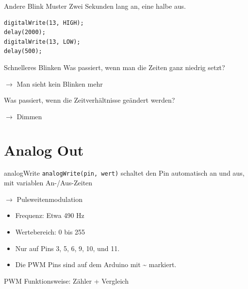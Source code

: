\documentclass[bigger]{beamer}
\begin{document}
\begin{frame}[fragile,label={sec:org77fbbf9}]{Andere Blink Muster}
 Zwei Sekunden lang an, eine halbe aus.

\pause

\begin{verbatim}
digitalWrite(13, HIGH);
delay(2000);
digitalWrite(13, LOW);
delay(500);
\end{verbatim}
\end{frame}

\begin{frame}[label={sec:orgf85b185}]{Schnelleres Blinken}
Was passiert, wenn man die Zeiten ganz niedrig setzt?
\pause

\(\rightarrow\) Man sieht kein Blinken mehr
\pause

Was passiert, wenn die Zeitverhältnisse geändert werden?
\pause

\(\rightarrow\) Dimmen
\end{frame}

\section{Analog Out}
\label{sec:org870f832}
\begin{frame}[fragile,label={sec:orge553d25}]{analogWrite}
 \texttt{analogWrite(pin, wert)} schaltet den Pin automatisch an und aus, mit
variablen An-/Aus-Zeiten 

\(\rightarrow\) Pulsweitenmodulation

\begin{itemize}
\item Frequenz: Etwa 490 Hz
\item Wertebereich: 0 bis 255
\item Nur auf Pins 3, 5, 6, 9, 10, und 11.
\item Die PWM Pins sind auf dem Arduino mit \textasciitilde{} markiert.
\end{itemize}
\end{frame}

\begin{frame}[label={sec:orgf1e05eb}]{PWM Funktionsweise: Zähler + Vergleich}
\end{frame}
\end{document}

